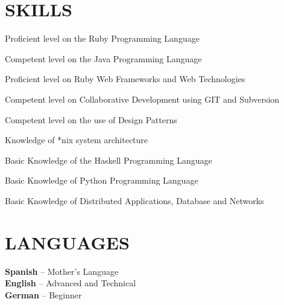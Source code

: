\documentclass[line,margin]{res}
\begin{document}
\address{7707 Arthur Av. Burnaby, BC. Canada}
\address{+1 (604) 728-4864}
 
\begin{resume}
 
\section{SKILLS} 
  \begin{list}{}{\leftmargin=1em}
    \item Proficient level on the Ruby Programming Language
    \item Competent level on the Java Programming Language
    \item Proficient level on Ruby Web Frameworks and Web Technologies
    \item Competent level on Collaborative Development using GIT and Subversion 
    \item Competent level on the use of Design Patterns
    \item Knowledge of *nix system architecture
    \item Basic Knowledge of the Haskell Programming Language
    \item Basic Knowledge of Python Programming Language
    \item Basic Knowledge of Distributed Applications, Database and Networks
  \end{list}

\section{LANGUAGES}
  \textbf{Spanish} -- Mother's Language \\
  \textbf{English} -- Advanced and Technical \\
  \textbf{German}  -- Beginner


\end{resume}
\end{document}

